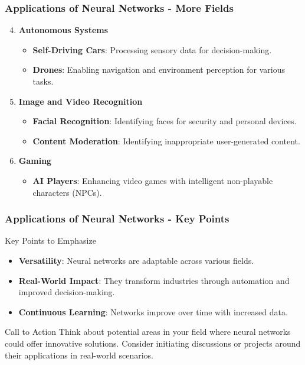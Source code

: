 \documentclass[aspectratio=169]{beamer}
\begin{document}
\begin{frame}[fragile]
    \frametitle{Applications of Neural Networks - More Fields}
    \begin{enumerate}
        \setcounter{enumi}{3} %
        \item \textbf{Autonomous Systems}
        \begin{itemize}
            \item \textbf{Self-Driving Cars}: Processing sensory data for decision-making.
            \item \textbf{Drones}: Enabling navigation and environment perception for various tasks.
        \end{itemize}
        \item \textbf{Image and Video Recognition}
        \begin{itemize}
            \item \textbf{Facial Recognition}: Identifying faces for security and personal devices.
            \item \textbf{Content Moderation}: Identifying inappropriate user-generated content.
        \end{itemize}
        \item \textbf{Gaming}
        \begin{itemize}
            \item \textbf{AI Players}: Enhancing video games with intelligent non-playable characters (NPCs).
        \end{itemize}
    \end{enumerate}
\end{frame}

\begin{frame}[fragile]
    \frametitle{Applications of Neural Networks - Key Points}
    \begin{block}{Key Points to Emphasize}
        \begin{itemize}
            \item \textbf{Versatility}: Neural networks are adaptable across various fields.
            \item \textbf{Real-World Impact}: They transform industries through automation and improved decision-making.
            \item \textbf{Continuous Learning}: Networks improve over time with increased data.
        \end{itemize}
    \end{block}
    \begin{block}{Call to Action}
        Think about potential areas in your field where neural networks could offer innovative solutions. 
        Consider initiating discussions or projects around their applications in real-world scenarios.
    \end{block}
\end{frame}
\end{document}
